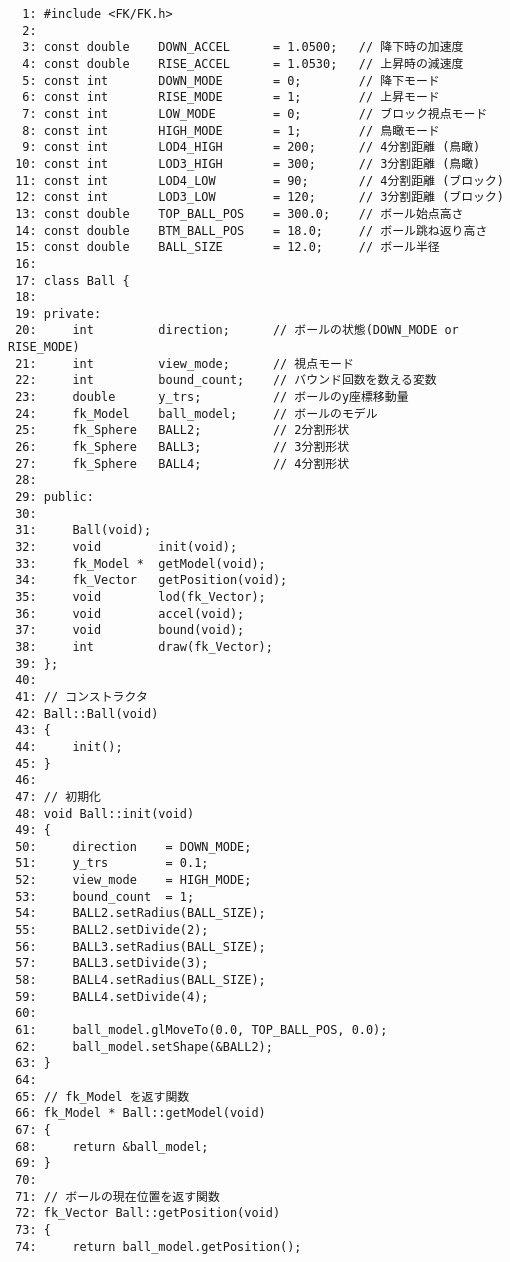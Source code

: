 \begin{breakbox}
\begin{verbatim}
  1: #include <FK/FK.h>
  2: 
  3: const double    DOWN_ACCEL      = 1.0500;   // 降下時の加速度
  4: const double    RISE_ACCEL      = 1.0530;   // 上昇時の減速度
  5: const int       DOWN_MODE       = 0;        // 降下モード
  6: const int       RISE_MODE       = 1;        // 上昇モード
  7: const int       LOW_MODE        = 0;        // ブロック視点モード
  8: const int       HIGH_MODE       = 1;        // 鳥瞰モード
  9: const int       LOD4_HIGH       = 200;      // 4分割距離 (鳥瞰)
 10: const int       LOD3_HIGH       = 300;      // 3分割距離 (鳥瞰)
 11: const int       LOD4_LOW        = 90;       // 4分割距離 (ブロック)
 12: const int       LOD3_LOW        = 120;      // 3分割距離 (ブロック)
 13: const double    TOP_BALL_POS    = 300.0;    // ボール始点高さ
 14: const double    BTM_BALL_POS    = 18.0;     // ボール跳ね返り高さ
 15: const double    BALL_SIZE       = 12.0;     // ボール半径
 16: 
 17: class Ball {
 18: 
 19: private:
 20:     int         direction;      // ボールの状態(DOWN_MODE or RISE_MODE)
 21:     int         view_mode;      // 視点モード
 22:     int         bound_count;    // バウンド回数を数える変数
 23:     double      y_trs;          // ボールのy座標移動量
 24:     fk_Model    ball_model;     // ボールのモデル
 25:     fk_Sphere   BALL2;          // 2分割形状
 26:     fk_Sphere   BALL3;          // 3分割形状
 27:     fk_Sphere   BALL4;          // 4分割形状
 28: 
 29: public:
 30: 
 31:     Ball(void);
 32:     void        init(void);
 33:     fk_Model *  getModel(void);
 34:     fk_Vector   getPosition(void);
 35:     void        lod(fk_Vector);
 36:     void        accel(void);
 37:     void        bound(void);
 38:     int         draw(fk_Vector);
 39: };
 40: 
 41: // コンストラクタ
 42: Ball::Ball(void)
 43: {
 44:     init();
 45: }
 46: 
 47: // 初期化
 48: void Ball::init(void)
 49: {
 50:     direction    = DOWN_MODE;
 51:     y_trs        = 0.1;
 52:     view_mode    = HIGH_MODE;
 53:     bound_count  = 1;
 54:     BALL2.setRadius(BALL_SIZE);
 55:     BALL2.setDivide(2);
 56:     BALL3.setRadius(BALL_SIZE);
 57:     BALL3.setDivide(3);
 58:     BALL4.setRadius(BALL_SIZE);
 59:     BALL4.setDivide(4);
 60: 
 61:     ball_model.glMoveTo(0.0, TOP_BALL_POS, 0.0);
 62:     ball_model.setShape(&BALL2);
 63: }
 64: 
 65: // fk_Model を返す関数
 66: fk_Model * Ball::getModel(void)
 67: {
 68:     return &ball_model;
 69: }
 70: 
 71: // ボールの現在位置を返す関数
 72: fk_Vector Ball::getPosition(void)
 73: {
 74:     return ball_model.getPosition();

\end{verbatim}
\end{breakbox}
